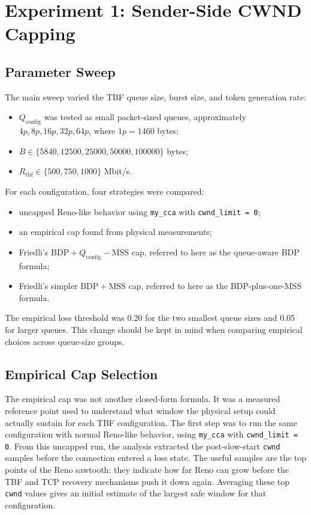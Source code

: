\documentclass{article}
\newcommand{\code}[1]{\texttt{#1}}
\newcommand{\mss}{\mathrm{MSS}}
\newcommand{\bdp}{\mathrm{BDP}}
\begin{document}
\section{Experiment 1: Sender-Side CWND Capping}

\subsection{Parameter Sweep}

The main sweep varied the TBF queue size, burst size, and token generation rate:

\begin{itemize}
  \item \(Q_{\mathrm{config}}\) was tested as small packet-sized queues, approximately \(4p, 8p, 16p, 32p, 64p\), where \(1p = 1460\) bytes;
  \item \(B \in \{5840, 12500, 25000, 50000, 100000\}\) bytes;
  \item \(R_{\mathrm{tbf}} \in \{500, 750, 1000\}\) Mbit/s.
\end{itemize}

For each configuration, four strategies were compared:

\begin{itemize}
  \item uncapped Reno-like behavior using \code{my\_cca} with \code{cwnd\_limit = 0};
  \item an empirical cap found from physical measurements;
  \item Friedli's \(\bdp + Q_{\mathrm{config}} - \mss\) cap, referred to here as the queue-aware BDP formula;
  \item Friedli's simpler \(\bdp + \mss\) cap, referred to here as the BDP-plus-one-MSS formula.
\end{itemize}

The empirical loss threshold was 0.20 for the two smallest queue sizes and 0.05 for larger queues. This change 
should be kept in mind when comparing empirical choices across queue-size groups.

\subsection{Empirical Cap Selection}

The empirical cap was not another closed-form formula. It was a measured reference point used to understand what 
window the physical setup could actually sustain for each TBF configuration. The first step was to run the same 
configuration with normal Reno-like behavior, using \code{my\_cca} with \code{cwnd\_limit = 0}. From this uncapped run, 
the analysis extracted the post-slow-start \code{cwnd} samples before the connection entered a loss state. The useful 
samples are the top points of the Reno sawtooth: they indicate how far Reno can grow before the TBF and TCP recovery 
mechanisms push it down again. Averaging these top \code{cwnd} values gives an initial estimate of the largest safe 
window for that configuration.
\end{document}
